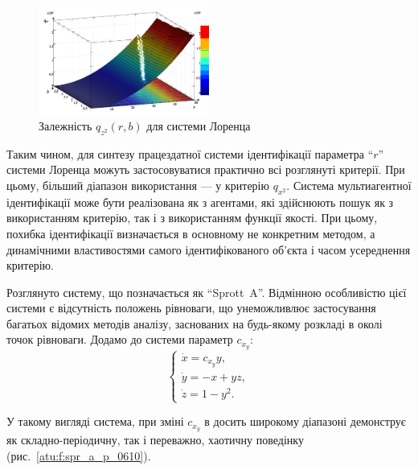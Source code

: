 \documentclass[a4paper,13pt]{atuaref}
\begin{document}
\begin{figure}[ht!]
  \centerline{  \includegraphics[width=0.50\textwidth]{p5/p/cha/lor/q2d/lor_qz2_r_b.png}  }
  \caption{Залежність $q_{z^2}(r,b)$ для системи Лоренца}
  \label{atu:f:lor_qz2_r_b}
\end{figure}


Таким чином,
для синтезу працездатної системи ідентифікації параметра ``$r$'' системи
Лоренца можуть застосовуватися практично всі розглянуті критерії. При цьому,
більший діапазон використання --- у критерію  $q_{x^2}$.
Система мультиагентної ідентифікації може бути реалізована як з агентами, які
здійснюють пошук як з використанням критерію, так і з використанням функції
якості. При цьому, похибка ідентифікації визначається в основному не конкретним
методом, а динамічними властивостями самого ідентифікованого об'єкта і
часом усереднення критерію.


Розглянуто систему, що позначається як ``Sprott~A''. Відмінною
особливістю цієї системи є відсутність положень рівноваги, що унеможливлює
застосування багатьох відомих методів аналізу, заснованих на будь-якому
розкладі в околі точок рівноваги.
Додамо до системи параметр $c_{x_y}$:
%
%
\begin{equation}
  \begin{cases}
    \dot{x} =  c_{x_y} y, \\
    \dot{y} = -x + yz, \\
    \dot{z} =  1 - y^2.
  \end{cases}
  \label{atu:eq:spr_a}
\end{equation}

У такому вигляді система, при зміні $c_{x_y}$ в досить широкому діапазоні
демонструє як складно-періодичну, так і переважно, хаотичну поведінку
(рис.~\ref{atu:f:spr_a_p_0610}).
\end{document}
